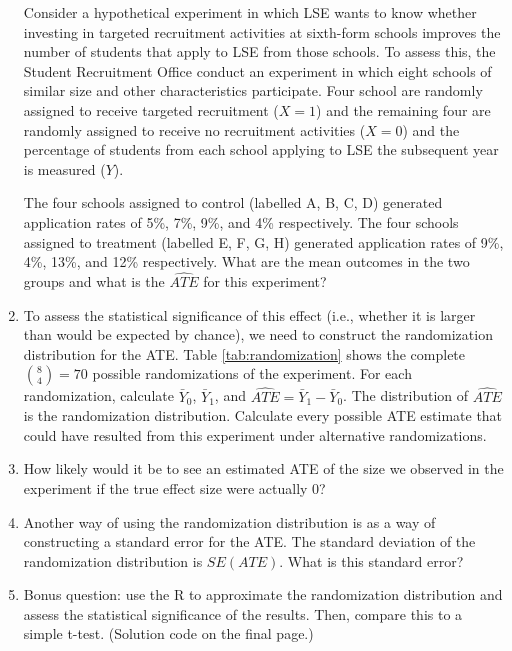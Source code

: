\documentclass[a4paper,12pt]{article}
\begin{document}
\begin{enumerate}
\noindent Consider a hypothetical experiment in which LSE wants to know whether investing in targeted recruitment activities at sixth-form schools improves the number of students that apply to LSE from those schools. To assess this, the Student Recruitment Office conduct an experiment in which eight schools of similar size and other characteristics participate. Four school are randomly assigned to receive targeted recruitment ($X = 1$) and the remaining four are randomly assigned to receive no recruitment activities ($X = 0$) and the percentage of students from each school applying to LSE the subsequent year is measured ($Y$).

\noindent The four schools assigned to control (labelled A, B, C, D) generated application rates of 5\%, 7\%, 9\%, and 4\% respectively. The four schools assigned to treatment (labelled E, F, G, H) generated application rates of 9\%, 4\%, 13\%, and 12\% respectively. What are the mean outcomes in the two groups and what is the $\widehat{ATE}$ for this experiment?

\item To assess the statistical significance of this effect (i.e., whether it is larger than would be expected by chance), we need to construct the randomization distribution for the ATE. Table \ref{tab:randomization} shows the complete ${{8}\choose{4}} = 70$ possible randomizations of the experiment. For each randomization, calculate $\bar{Y}_0$, $\bar{Y}_1$, and $\widehat{ATE} = \bar{Y}_1 - \bar{Y}_0$. The distribution of $\widehat{ATE}$ is the randomization distribution. Calculate every possible ATE estimate that could have resulted from this experiment under alternative randomizations.

\item How likely would it be to see an estimated ATE of the size we observed in the experiment if the true effect size were actually 0?

\item Another way of using the randomization distribution is as a way of constructing a standard error for the ATE. The standard deviation of the randomization distribution is $SE(ATE)$. What is this standard error?

\item Bonus question: use the R to approximate the randomization distribution and assess the statistical significance of the results. Then, compare this to a simple t-test. (Solution code on the final page.)

\clearpage

\end{enumerate}
\end{document}
